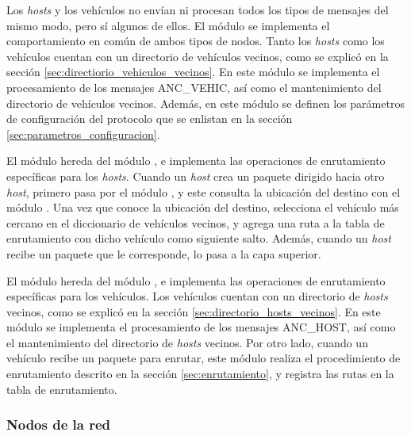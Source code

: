 Los \textit{hosts} y los vehículos no envían ni procesan todos los tipos de
mensajes del mismo modo, pero sí algunos de ellos. El módulo
 se implementa el comportamiento en común de ambos
tipos de nodos. Tanto los \textit{hosts} como los vehículos cuentan con un
directorio de vehículos vecinos, como se explicó en la sección
\ref{sec:directiorio_vehiculos_vecinos}. En este módulo se implementa el
procesamiento de los mensajes ANC\_VEHIC, así como el mantenimiento del
directorio de vehículos vecinos. Además, en este módulo se definen los
parámetros de configuración del protocolo que se enlistan en la sección
\ref{sec:parametros_configuracion}.

\begin{sloppypar}
El módulo  hereda del módulo
, e implementa las operaciones de enrutamiento
específicas para los \textit{hosts}. Cuando un \textit{host} crea un paquete
dirigido hacia otro \textit{host}, primero pasa por el módulo
, y este consulta la ubicación del destino con
el módulo . Una vez que conoce la ubicación del
destino, selecciona el vehículo más cercano en el diccionario de vehículos
vecinos, y agrega una ruta a la tabla de enrutamiento con dicho vehículo como
siguiente salto. Además, cuando un \textit{host} recibe un paquete que le
corresponde, lo pasa a la capa superior.
\end{sloppypar}

El módulo  hereda del módulo
, e implementa las operaciones de enrutamiento
específicas para los vehículos. Los vehículos cuentan con un directorio de
\textit{hosts} vecinos, como se explicó en la sección
\ref{sec:directorio_hosts_vecinos}. En este módulo se implementa el
procesamiento de los mensajes ANC\_HOST, así como el mantenimiento del
directorio de \textit{hosts} vecinos. Por otro lado, cuando un vehículo recibe
un paquete para enrutar, este módulo realiza el procedimiento de enrutamiento
descrito en la sección \ref{sec:enrutamiento}, y registra las rutas en la tabla
de enrutamiento.


\subsubsection{Nodos de la red}

